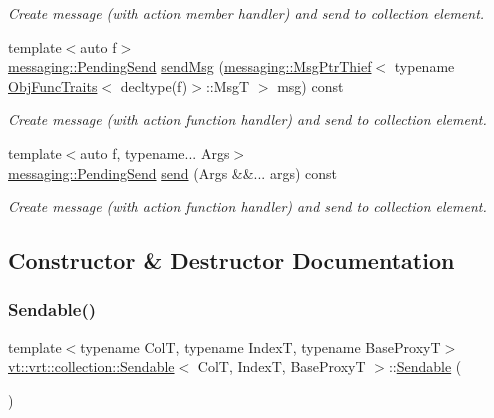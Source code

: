 \begin{DoxyCompactItemize}
\begin{DoxyCompactList}\small\item\em Create message (with action member handler) and send to collection element. \end{DoxyCompactList}\item 
{\footnotesize template$<$auto f$>$ }\\\hyperlink{structvt_1_1messaging_1_1_pending_send}{messaging\+::\+Pending\+Send} \hyperlink{structvt_1_1vrt_1_1collection_1_1_sendable_adb5d41d0563ccc3d9b29f547d2b45687}{send\+Msg} (\hyperlink{structvt_1_1messaging_1_1_msg_ptr_thief}{messaging\+::\+Msg\+Ptr\+Thief}$<$ typename \hyperlink{structvt_1_1_obj_func_traits}{Obj\+Func\+Traits}$<$ decltype(f)$>$\+::MsgT $>$ msg) const
\begin{DoxyCompactList}\small\item\em Create message (with action function handler) and send to collection element. \end{DoxyCompactList}\item 
{\footnotesize template$<$auto f, typename... Args$>$ }\\\hyperlink{structvt_1_1messaging_1_1_pending_send}{messaging\+::\+Pending\+Send} \hyperlink{structvt_1_1vrt_1_1collection_1_1_sendable_a2de5ccb7685ed0d975315944da492491}{send} (Args \&\&... args) const
\begin{DoxyCompactList}\small\item\em Create message (with action function handler) and send to collection element. \end{DoxyCompactList}\end{DoxyCompactItemize}


\subsection{Constructor \& Destructor Documentation}
\mbox{\label{structvt_1_1vrt_1_1collection_1_1_sendable_a26f7014b7bb14f0e4b758b5b076834f1}} 
\subsubsection{\texorpdfstring{Sendable()}{Sendable()}\hspace{0.1cm}{\footnotesize\ttfamily [1/2]}}
{\footnotesize\ttfamily template$<$typename ColT, typename IndexT, typename Base\+ProxyT$>$ \\
\hyperlink{structvt_1_1vrt_1_1collection_1_1_sendable}{vt\+::vrt\+::collection\+::\+Sendable}$<$ ColT, IndexT, Base\+ProxyT $>$\+::\hyperlink{structvt_1_1vrt_1_1collection_1_1_sendable}{Sendable} (\begin{DoxyParamCaption}{ }\end{DoxyParamCaption})\hspace{0.3cm}{\ttfamily [default]}}


